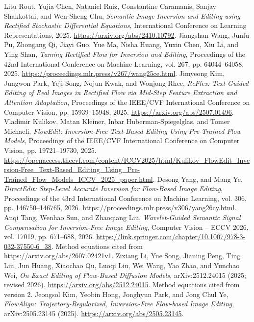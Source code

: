  Litu Rout, Yujia Chen, Nataniel Ruiz, Constantine Caramanis, Sanjay Shakkottai, and Wen-Sheng Chu, \textit{Semantic Image Inversion and Editing using Rectified Stochastic Differential Equations}, International Conference on Learning Representations, 2025. \url{https://arxiv.org/abs/2410.10792}.
 Jiangshan Wang, Junfu Pu, Zhongang Qi, Jiayi Guo, Yue Ma, Nisha Huang, Yuxin Chen, Xiu Li, and Ying Shan, \textit{Taming Rectified Flow for Inversion and Editing}, Proceedings of the 42nd International Conference on Machine Learning, vol. 267, pp. 64044--64058, 2025. \url{https://proceedings.mlr.press/v267/wang25ce.html}.
 Jimyeong Kim, Jungwon Park, Yeji Song, Nojun Kwak, and Wonjong Rhee, \textit{{ReFlex}: Text-Guided Editing of Real Images in Rectified Flow via Mid-Step Feature Extraction and Attention Adaptation}, Proceedings of the IEEE/CVF International Conference on Computer Vision, pp. 15939--15948, 2025. \url{https://arxiv.org/abs/2507.01496}.
 Vladimir Kulikov, Matan Kleiner, Inbar Huberman-Spiegelglas, and Tomer Michaeli, \textit{{FlowEdit}: Inversion-Free Text-Based Editing Using Pre-Trained Flow Models}, Proceedings of the IEEE/CVF International Conference on Computer Vision, pp. 19721--19730, 2025. \url{https://openaccess.thecvf.com/content/ICCV2025/html/Kulikov_FlowEdit_Inversion-Free_Text-Based_Editing_Using_Pre-Trained_Flow_Models_ICCV_2025_paper.html}.
 Desong Yang, and Mang Ye, \textit{{DirectEdit}: Step-Level Accurate Inversion for Flow-Based Image Editing}, Proceedings of the 43rd International Conference on Machine Learning, vol. 306, pp. 146750--146765, 2026. \url{https://proceedings.mlr.press/v306/yang26cy.html}.
 Anqi Tang, Wenhao Sun, and Zhaoqiang Liu, \textit{Wavelet-Guided Semantic Signal Compensation for Inversion-Free Image Editing}, Computer Vision -- ECCV 2026, vol. 17019, pp. 671--688, 2026. \url{https://link.springer.com/chapter/10.1007/978-3-032-37550-6_38}. Method equations cited from \url{https://arxiv.org/abs/2607.02421v1}.
 Zixiang Li, Yue Song, Jianing Peng, Ting Liu, Jun Huang, Xiaochao Qu, Luoqi Liu, Wei Wang, Yao Zhao, and Yunchao Wei, \textit{On Exact Editing of Flow-Based Diffusion Models}, arXiv:2512.24015 (2025; revised 2026). \url{https://arxiv.org/abs/2512.24015}. Method equations cited from version 2.
 Jeongsol Kim, Yeobin Hong, Jonghyun Park, and Jong Chul Ye, \textit{FlowAlign: Trajectory-Regularized, Inversion-Free Flow-based Image Editing}, arXiv:2505.23145 (2025). \url{https://arxiv.org/abs/2505.23145}.
